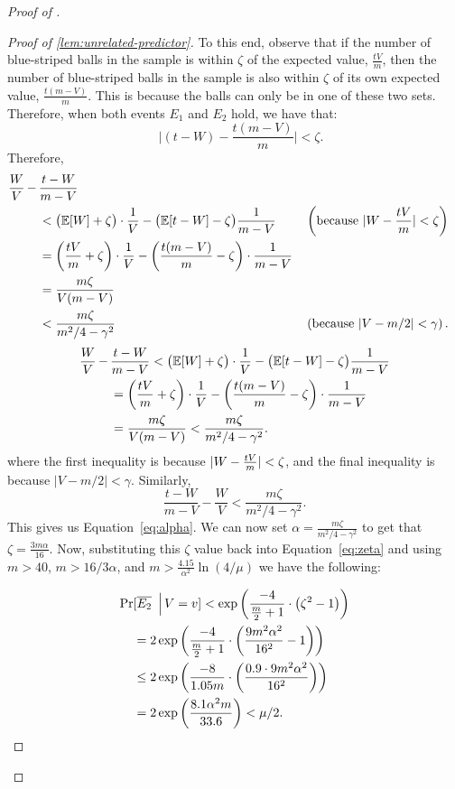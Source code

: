 \begin{proof}[Proof of ]
\begin{proof}[Proof of \cref{lem:unrelated-predictor}]
To this end, observe that if the number of blue-striped balls in the sample is within $\zeta$ of the expected value, $\frac{tV}{m}$, then the number of blue-striped balls in the sample is also within $\zeta$ of its own expected value, $\frac{t(m-V)}{m}$. This is because the balls can only be in one of these two sets. Therefore, when both events $E_1$ and $E_2$ hold, we have that:
\[\quad \Big|(t-W)-\frac{t(m-V)}{m} \Big| < \zeta.\]
Therefore,
\ifnum{}
    \begin{align*}
    \frac{W}{V}\, -\, &\frac{t-W}{m - V}\\
    &< \big(\mathbb{E}[W] + \zeta\big)\cdot\frac{1}{V} - \big(\mathbb{E}[t-W] - \zeta\big)\frac{1}{m - V}
    &&\left(\text{because }\vert W-\frac{tV}{m}\rvert < \zeta\right)\\
    &= \left(\frac{tV}{m} + \zeta\right)\cdot\frac{1}{V} - \left(\frac{t(m-V)}{m} - \zeta\right)\cdot\frac{1}{m - V}\\
    &=\frac{m\zeta}{V(m-V)}\\
    &< \frac{m\zeta}{m^2/4 - \gamma^2}
    &&\left(\text{because }|V - m/2| < \gamma\right).
    \end{align*}
\else
    \begin{align*}
    \frac{W}{V}\, -\, &\frac{t-W}{m - V} < \big(\mathbb{E}[W] + \zeta\big)\cdot\frac{1}{V} - \big(\mathbb{E}[t-W] - \zeta\big)\frac{1}{m - V}
    \\
    &= \left(\frac{tV}{m} + \zeta\right)\cdot\frac{1}{V} - \left(\frac{t(m-V)}{m} - \zeta\right)\cdot\frac{1}{m - V}\\
    &=\frac{m\zeta}{V(m-V)} < \frac{m\zeta}{m^2/4 - \gamma^2}.
    \end{align*}
    where the first inequality is because $\vert W-\frac{tV}{m}\rvert < \zeta$, and the final inequality is because $|V - m/2| < \gamma$.
\fi
 Similarly, 
    $$\frac{t-W}{m - V} - \frac{W}{V} < \frac{m\zeta}{m^2/4 - \gamma^2}.$$
    This gives us Equation~\ref{eq:alpha}. We can now set $\alpha = \frac{m\zeta}{m^2/4 - \gamma^2}$ to get that $\zeta = \frac{3m\alpha}{16}$. 
    Now, substituting this $\zeta$ value back into Equation~\ref{eq:zeta} and using $m > 40$, $m>16/3\alpha$, and $m > \frac{4.15}{\alpha^2}\ln(4/\mu)$ we have the following:
    
    \begin{align*}
        \Pr& [ \overline{E_2} \,\,\,\Big\vert\, V = v] < \exp\left(\frac{-4}{\frac{m}{2}+1}\cdot \left( \zeta^2 - 1\right)\right)\\
        &= 2\exp\left(\frac{-4}{\frac{m}{2}+1}\cdot \left( \frac{9m^2\alpha^2}{16^2} - 1\right)\right)\\
        &\leq 2\exp\left(\frac{-8}{1.05m}\cdot \left( \frac{0.9\cdot9m^2\alpha^2}{16^2}\right)\right)\\
        &= 2\exp\left(\frac{8.1\alpha^2m}{33.6}\right) < \mu/2.
    \end{align*}


\end{proof}
\end{proof}
